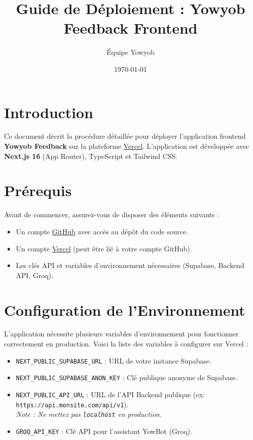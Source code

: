 \documentclass[a4paper,12pt]{article}
\title{\textbf{Guide de Déploiement : Yowyob Feedback Frontend}}
\author{Équipe Yowyob}
\date{\today}
\begin{document}
\maketitle

\section{Introduction}
Ce document décrit la procédure détaillée pour déployer l'application frontend \textbf{Yowyob Feedback} sur la plateforme \href{https://vercel.com}{Vercel}. L'application est développée avec \textbf{Next.js 16} (App Router), TypeScript et Tailwind CSS.

\section{Prérequis}
Avant de commencer, assurez-vous de disposer des éléments suivants :
\begin{itemize}
    \item Un compte \href{https://github.com}{GitHub} avec accès au dépôt du code source.
    \item Un compte \href{https://vercel.com}{Vercel} (peut être lié à votre compte GitHub).
    \item Les clés API et variables d'environnement nécessaires (Supabase, Backend API, Groq).
\end{itemize}

\section{Configuration de l'Environnement}
L'application nécessite plusieurs variables d'environnement pour fonctionner correctement en production. Voici la liste des variables à configurer sur Vercel :

\begin{itemize}
    \item \texttt{NEXT\_PUBLIC\_SUPABASE\_URL} : URL de votre instance Supabase.
    \item \texttt{NEXT\_PUBLIC\_SUPABASE\_ANON\_KEY} : Clé publique anonyme de Supabase.
    \item \texttt{NEXT\_PUBLIC\_API\_URL} : URL de l'API Backend publique (ex: \texttt{https://api.monsite.com/api/v1}). \\ \textit{Note : Ne mettez pas \texttt{localhost} en production.}
    \item \texttt{GROQ\_API\_KEY} : Clé API pour l'assistant YowBot (Groq).
\end{itemize}
\end{document}
